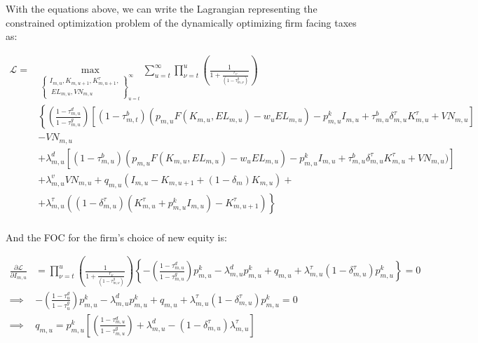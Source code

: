 \documentclass[letterpaper,12pt]{article}
\theoremstyle{definition}
\begin{document}
\begin{spacing}{1.5}
With the equations above, we can write the Lagrangian representing the constrained optimization problem of the dynamically optimizing firm facing taxes as: 

\begin{equation}
\label{eqn:firm_lagrange_tax2}
\begin{split}
\mathcal{L} = &  \max_{\left\{\substack{I_{m,u},K_{m,u+1},K^{\tau}_{m,u+1},\\\ EL_{m,u},VN_{m,u}}\right\}_{u=t}^{\infty}} \sum_{u=t}^{\infty} \prod_{\nu=t}^{u} \left(\frac{1}{1+\frac{r_{v}}{(1-\tau^{g}_{m,\nu})}}\right)\\
& \left\{ \left(\frac{1-\tau^{d}_{m,u}}{1-\tau^{g}_{m,u}}\right) \left[(1-\tau^{b}_{m,t})\left(p_{m,u}F(K_{m,u},EL_{m,u}) - w_{u}EL_{m,u}\right) -p^{k}_{m,u}I_{m,u} + \tau^{b}_{m,u}\delta^{\tau}_{m,u}K^{\tau}_{m,u} +VN_{m,u}\right]  \right.\\
       & \left. - VN_{m,u} \right. \\
       &+\left. \lambda^{d}_{m,u}\left[(1-\tau^{b}_{m,u})(p_{m,u}F(K_{m,u},EL_{m,u}) - w_{u}EL_{m,u}) -p^{k}_{m,u}I_{m,u}+ \tau^{b}_{m,u}\delta^{\tau}_{m,u}K^{\tau}_{m,u} +VN_{m,u})\right] \right. \\
       &+ \left. \lambda^{v}_{m,u}VN_{m,u} + q_{m,u}(I_{m,u} - K_{m,u+1} +(1-\delta_{m})K_{m,u}) + \right. \\
       & +\left. \lambda^{\tau}_{m,u}((1-\delta^{\tau}_{m,u})(K^{\tau}_{m,u}+p^{k}_{m,u}I_{m,u}) - K^{\tau}_{m,u+1})\right\}  \\
\end{split}
\end{equation}

And the FOC for the firm's choice of new equity is:

\begin{equation}
\label{eqn:lagrange_foc_i_tax}
\begin{split}
 \frac{\partial \mathcal{L}}{\partial I_{m,u}} & =   \prod_{\nu=t}^{u} \left(\frac{1}{1+\frac{r_{\nu}}{(1-\tau^{g}_{m,\nu})}}\right) \left\{-\left(\frac{1-\tau^{d}_{m,u}}{1-\tau^{g}_{m,u}}\right)p^{k}_{m,u} - \lambda^{d}_{m,u}p^{k}_{m,u} + q_{m,u}  + \lambda^{\tau}_{m,u}(1-\delta^{\tau}_{m,u})p^{k}_{m,u} \right\} = 0 \\
\implies &-\left(\frac{1-\tau^{d}_{u}}{1-\tau^{g}_{u}}\right)p^{k}_{m,u} - \lambda^{d}_{m,u}p^{k}_{m,u} + q_{m,u}  + \lambda^{\tau}_{m,u}(1-\delta^{\tau}_{m,u})p^{k}_{m,u}  = 0 \\
\implies &  q_{m,u} = p^{k}_{m,u}\left[\left(\frac{1-\tau^{d}_{m,u}}{1-\tau^{g}_{m,u}}\right) + \lambda^{d}_{m,u} - (1-\delta^{\tau}_{m,u})\lambda^{\tau}_{m,u} \right]  \\
\end{split}
\end{equation}



\end{spacing}
\end{document}
